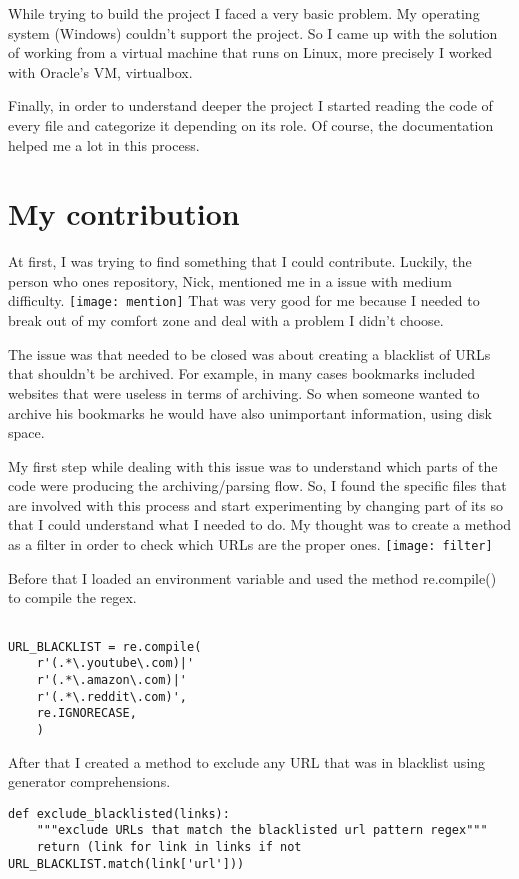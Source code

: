 \documentclass{article}
\begin{document}
While trying to build the project I faced a very basic problem. My operating system (Windows) couldn't support the project. So I came up with the solution of working from a virtual machine that runs on Linux, more precisely I worked with Oracle's VM, virtualbox. 

Finally, in order to understand deeper the project I started reading the code of every file and categorize it depending on its role. Of course, the documentation helped me a lot in this process.


\section{My contribution}

At first, I was trying to find something that I could contribute. Luckily, the person who ones repository, Nick, mentioned me in a issue with medium difficulty.
\texttt{[image: mention]}
That was very good for me because I needed to break out of my comfort zone and deal with a problem I didn't choose.

The issue was that needed to be closed was about creating a blacklist of URLs that shouldn't be archived. For example, in many cases bookmarks included websites that were useless in terms of archiving. So when someone wanted to archive his bookmarks he would have also unimportant information, using disk space.

My first step while dealing with this issue was to understand which parts of the code were producing the archiving/parsing flow. So, I found the specific files that are involved with this process and start experimenting by changing part of its so that I could understand what I needed to do. My thought was to create a method as a filter in order to check which URLs are the proper ones. 
\texttt{[image: filter]}

Before that I loaded an environment variable and used the method re.compile() to compile the regex.
\begin{center}
\begin{verbatim}

URL_BLACKLIST = re.compile(
    r'(.*\.youtube\.com)|'
    r'(.*\.amazon\.com)|'
    r'(.*\.reddit\.com)',
    re.IGNORECASE,
    ) 
\end{verbatim}
\end{center}

After that I created a method to exclude any URL that was in blacklist using generator comprehensions. 
\begin{verbatim}
def exclude_blacklisted(links):
    """exclude URLs that match the blacklisted url pattern regex"""
    return (link for link in links if not URL_BLACKLIST.match(link['url']))
\end{verbatim}
\end{document}
